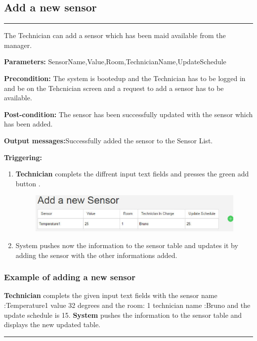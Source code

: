 \subsection{Add a new sensor}

\hrule
\hfill
\vspace{0.5cm}

\label{operation:Add a new sensor}
The Technician can add a sensor which has been maid available from the manager.
\begin{description}
\item \textbf{Parameters:} SensorName,Value,Room,TechnicianName,UpdateSchedule
\item \textbf{Precondition:} The system is bootedup and the Technician has to be
logged in and be on the Tehcnician screen and a request to add a sensor has to
be available.
\item \textbf{Post-condition:} The sensor has been successfully updated with the
sensor which has been added.
\item \textbf{Output messages:}Successfully added the sensor to the Sensor List.
\item \textbf{Triggering:}
\begin{enumerate}
\item \textbf{Technician} complets the diffrent input text fields and presses
the green add button .
\begin{figure}[H]
\includegraphics[width=1\textwidth]{images/AddANewSensorTechnician.eps}
\end{figure}
\item System pushes now the information to the sensor table and updates it by
adding the sensor with the other informations added.
\end{enumerate}
\end{description}

\subsubsection{Example of adding a new sensor}
\textbf{Technician} complets the given input text fields with the sensor name
:Temperature1 value 32 degrees and the room: 1 technician name :Bruno and the
update schedule is 15. \textbf{System} pushes the information to the sensor
table and displays the new updated table.
\hfill
\vspace{0.5cm}
\hrule


